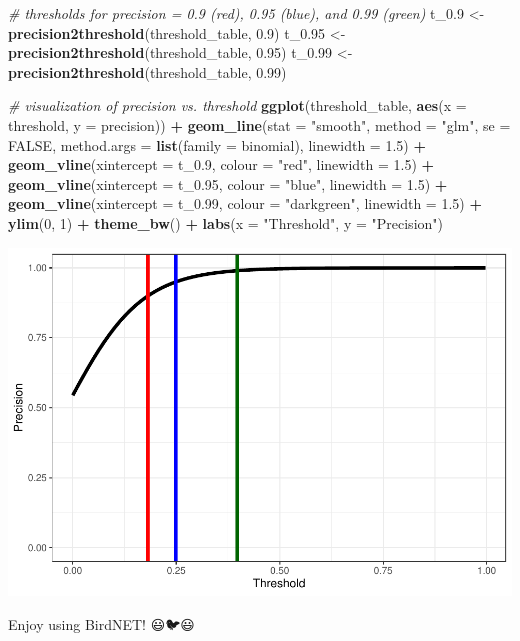 \documentclass[
]{article}
\newenvironment{Shaded}{\begin{snugshade}}{\end{snugshade}}
\newcommand{\AttributeTok}[1]{\textcolor[rgb]{0.13,0.29,0.53}{#1}}
\newcommand{\CommentTok}[1]{\textcolor[rgb]{0.56,0.35,0.01}{\textit{#1}}}
\newcommand{\ConstantTok}[1]{\textcolor[rgb]{0.56,0.35,0.01}{#1}}
\newcommand{\DecValTok}[1]{\textcolor[rgb]{0.00,0.00,0.81}{#1}}
\newcommand{\FloatTok}[1]{\textcolor[rgb]{0.00,0.00,0.81}{#1}}
\newcommand{\FunctionTok}[1]{\textcolor[rgb]{0.13,0.29,0.53}{\textbf{#1}}}
\newcommand{\NormalTok}[1]{#1}
\newcommand{\OtherTok}[1]{\textcolor[rgb]{0.56,0.35,0.01}{#1}}
\newcommand{\SpecialCharTok}[1]{\textcolor[rgb]{0.81,0.36,0.00}{\textbf{#1}}}
\newcommand{\StringTok}[1]{\textcolor[rgb]{0.31,0.60,0.02}{#1}}
\begin{document}
\begin{Shaded}
\begin{Highlighting}[]
\CommentTok{\# thresholds for precision = 0.9 (red), 0.95 (blue), and 0.99 (green)}
\NormalTok{t\_0}\FloatTok{.9} \OtherTok{\textless{}{-}} \FunctionTok{precision2threshold}\NormalTok{(threshold\_table, }\FloatTok{0.9}\NormalTok{)}
\NormalTok{t\_0}\FloatTok{.95} \OtherTok{\textless{}{-}} \FunctionTok{precision2threshold}\NormalTok{(threshold\_table, }\FloatTok{0.95}\NormalTok{)}
\NormalTok{t\_0}\FloatTok{.99} \OtherTok{\textless{}{-}} \FunctionTok{precision2threshold}\NormalTok{(threshold\_table, }\FloatTok{0.99}\NormalTok{)}


\CommentTok{\# visualization of precision vs. threshold}
\FunctionTok{ggplot}\NormalTok{(threshold\_table, }\FunctionTok{aes}\NormalTok{(}\AttributeTok{x =}\NormalTok{ threshold, }
                            \AttributeTok{y =}\NormalTok{ precision)) }\SpecialCharTok{+}
  \FunctionTok{geom\_line}\NormalTok{(}\AttributeTok{stat =} \StringTok{"smooth"}\NormalTok{,}
            \AttributeTok{method =} \StringTok{"glm"}\NormalTok{, }
            \AttributeTok{se =} \ConstantTok{FALSE}\NormalTok{, }
            \AttributeTok{method.args =} \FunctionTok{list}\NormalTok{(}\AttributeTok{family =}\NormalTok{ binomial),}
            \AttributeTok{linewidth =} \FloatTok{1.5}\NormalTok{) }\SpecialCharTok{+}
  \FunctionTok{geom\_vline}\NormalTok{(}\AttributeTok{xintercept =}\NormalTok{ t\_0}\FloatTok{.9}\NormalTok{, }\AttributeTok{colour =} \StringTok{"red"}\NormalTok{, }\AttributeTok{linewidth =} \FloatTok{1.5}\NormalTok{) }\SpecialCharTok{+}
  \FunctionTok{geom\_vline}\NormalTok{(}\AttributeTok{xintercept =}\NormalTok{ t\_0}\FloatTok{.95}\NormalTok{, }\AttributeTok{colour =} \StringTok{"blue"}\NormalTok{, }\AttributeTok{linewidth =} \FloatTok{1.5}\NormalTok{) }\SpecialCharTok{+}
  \FunctionTok{geom\_vline}\NormalTok{(}\AttributeTok{xintercept =}\NormalTok{ t\_0}\FloatTok{.99}\NormalTok{, }\AttributeTok{colour =} \StringTok{"darkgreen"}\NormalTok{, }\AttributeTok{linewidth =} \FloatTok{1.5}\NormalTok{) }\SpecialCharTok{+}
  \FunctionTok{ylim}\NormalTok{(}\DecValTok{0}\NormalTok{, }\DecValTok{1}\NormalTok{) }\SpecialCharTok{+}
  \FunctionTok{theme\_bw}\NormalTok{() }\SpecialCharTok{+}
  \FunctionTok{labs}\NormalTok{(}\AttributeTok{x =} \StringTok{"Threshold"}\NormalTok{, }
       \AttributeTok{y =} \StringTok{"Precision"}\NormalTok{)}
\end{Highlighting}
\end{Shaded}

\includegraphics{species_specific_method_tutorial_files/figure-latex/unnamed-chunk-9-1.pdf}

Enjoy using BirdNET! 😃🐦😃
\end{document}

